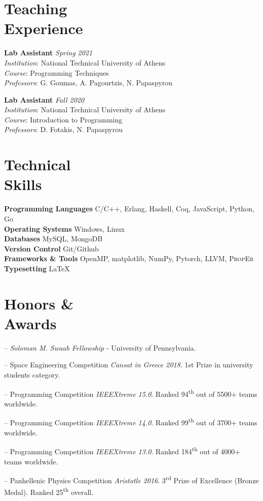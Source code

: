 \documentclass[margin]{res}
\newcommand{\field}[2]{\noindent \textbf{#1} \hfill #2 \\}
\begin{document}
\begin{resume}
\section{Teaching \\ Experience}

\field{Lab Assistant}{\emph{Spring 2021}}
\textit{Institution}: National Technical University of Athens \\
\textit{Course}: Programming Techniques \\
\textit{Professors}: G. Goumas, A. Pagourtzis, N. Papaspyrou

\field{Lab Assistant}{\emph{Fall 2020}}
\textit{Institution}: National Technical University of Athens \\
\textit{Course}: Introduction to Programming \\
\textit{Professors}: D. Fotakis, N. Papaspyrou

\section{Technical \\ Skills}

\field{Programming Languages}  {C/C++, Erlang, Haskell, Coq, JavaScript, Python, Go}
\field{Operating Systems} {Windows, Linux}
\field{Databases} {MySQL, MongoDB}
\field{Version Control} {Git/Github}
\field{Frameworks \& Tools} {OpenMP, matplotlib, NumPy, Pytorch, LLVM, \textsc{PropEr}}
\field{Typesetting} {\LaTeX}

\section{Honors \& \\ Awards} 

\begin{compactitem}
  \item[--] 
    \emph{Soloman M. Swaab Fellowship} - University of Pennsylvania.
	\item[--] 
    Space Engineering Competition \emph{Cansat in Greece 2018}.
    1st Prize in university students category.
  \item[--] 
    Programming Competition \emph{IEEEXtreme 15.0}.
    Ranked 94\textsuperscript{th} out of 5500+ teams worldwide.
  \item[--] 
    Programming Competition \emph{IEEEXtreme 14.0}.
    Ranked 99\textsuperscript{th} out of 3700+ teams worldwide.
  \item[--] 
    Programming Competition \emph{IEEEXtreme 13.0}.
    Ranked 184\textsuperscript{th} out of 4000+ teams worldwide.
  \item[--] 
    Panhellenic Physics Competition \emph{Aristotle 2016}.
    3\textsuperscript{rd} Prize of Excellence (Bronze Medal). 
    Ranked 25\textsuperscript{th} overall.
\end{compactitem}


\end{resume}
\end{document}
